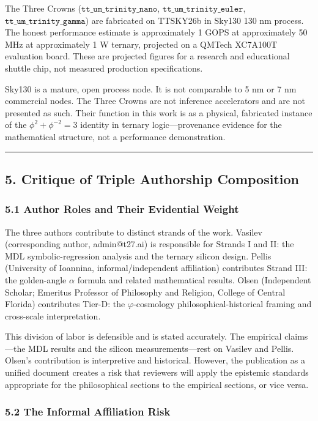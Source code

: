The Three Crowns ($\texttt{tt\_um\_trinity\_nano}$, $\texttt{tt\_um\_trinity\_euler}$, $\texttt{tt\_um\_trinity\_gamma}$) are fabricated on TTSKY26b in Sky130 130 nm process. The honest performance estimate is approximately 1 GOPS at approximately 50 MHz at approximately 1 W ternary, projected on a QMTech XC7A100T evaluation board. These are projected figures for a research and educational shuttle chip, not measured production specifications.

Sky130 is a mature, open process node. It is not comparable to 5 nm or 7 nm commercial nodes. The Three Crowns are not inference accelerators and are not presented as such. Their function in this work is as a physical, fabricated instance of the $\phi^2 + \phi^{-2} = 3$ identity in ternary logic---provenance evidence for the mathematical structure, not a performance demonstration.

\noindent\rule{\textwidth}{0.4pt}

\subsection{5. Critique of Triple Authorship Composition}

\subsubsection{5.1 Author Roles and Their Evidential Weight}

The three authors contribute to distinct strands of the work. Vasilev (corresponding author, admin@t27.ai) is responsible for Strands I and II: the MDL symbolic-regression analysis and the ternary silicon design. Pellis (University of Ioannina, informal/independent affiliation) contributes Strand III: the golden-angle $\alpha$ formula and related mathematical results. Olsen (Independent Scholar; Emeritus Professor of Philosophy and Religion, College of Central Florida) contributes Tier-D: the $\varphi$-cosmology philosophical-historical framing and cross-scale interpretation.

This division of labor is defensible and is stated accurately. The empirical claims---the MDL results and the silicon measurements---rest on Vasilev and Pellis. Olsen's contribution is interpretive and historical. However, the publication as a unified document creates a risk that reviewers will apply the epistemic standards appropriate for the philosophical sections to the empirical sections, or vice versa.

\subsubsection{5.2 The Informal Affiliation Risk}

